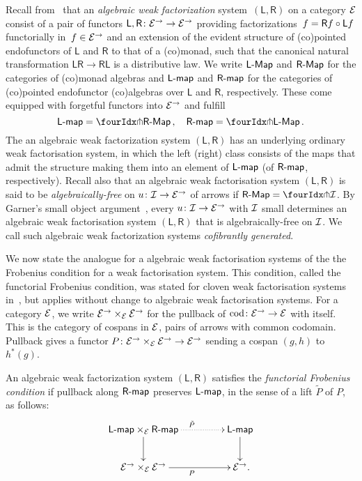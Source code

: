 \documentclass[reqno,10pt,a4paper,oneside,draft]{amsart}
\newcommand{\LL}{\mathsf{L}}
\newcommand{\RR}{\mathsf{R}}
\begin{document}
{{Recall from~\cite{garner:small-object-argument,grandis-tholen-nwfs} that an \emph{algebraic weak factorization} system~$(\LL, \RR)$ on a category $\cal{E}$ consist of a pair of functors $\LL, \RR \co \cal{E}^\to \to \cal{E}^\to$ providing factorizations~$f = \RR f \cc \LL f$ functorially in~$f \in \cal{E}^\to$ and an extension of the 
evident structure of (co)pointed endofunctors of $\LL$ and $\RR$ to that of a (co)monad, such that the canonical natural transformation $\LL \RR \to \RR \LL$ is a distributive law. 
We write $\pCoalg{\LL}$ and $\pAlg{\RR}$ for the categories of (co)monad algebras and $\pcoalg{\LL}$ and $\palg{\RR}$ for the categories of (co)pointed endofunctor (co)algebras over $\LL$ and $\RR$, respectively.
These come equipped with forgetful functors into $\cal{E}^\to$ and fulfill 
\[
\pcoalg{\LL} = \liftl{\pAlg{\RR}} \, , \quad \palg{\RR} = \liftr{\pCoalg{\LL}} \, .
\]
The an algebraic weak factorization system $(\LL, \RR)$ has an underlying ordinary weak factorisation system, in which the left (right) class 
consists of the maps that admit the structure making them into an element of $\pcoalg{\LL}$ (of $\palg{\RR}$, respectively). Recall also that an algebraic weak factorisation system 
$(\LL, \RR)$ is said to be \emph{algebraically-free} on $u \co \cal{I} \to \cal{E}^\to$ of arrows if $\pAlg{\RR} = \liftr{\cal{I}}$. By Garner's small object argument~\cite{garner:small-object-argument}, every $u \co \cal{I} \to \cal{E}^\to$ with $\cal{I}$ small determines an algebraic weak factorisation system $(\LL, \RR)$ that is algebraically-free on $\cal{I}$. We call such algebraic
weak factorization systems \emph{cofibrantly generated}.


We now state the analogue for a algebraic weak factorisation systems of the the Frobenius condition for a weak factorisation system.
This condition, called the functorial Frobenius condition, was stated for cloven weak factorisation systems in~\cite{garner:topological-simplicial},
but applies without change to algebraic weak factorisation systems. For a category $\cal{E}$, we write $\cal{E}^\to \times_\cal{E} \cal{E}^\to$
for the pullback of $\cod \co \cal{E}^\to \to \cal{E}$ with itself. This is the category of cospans in
$\cal{E}$, \ie pairs of arrows with common codomain. Pullback gives a functor
$P \co  \cal{E}^\to \times_{\cal{E}} \cal{E}^\to \to \cal{E}^\to$
sending a cospan $(g, h)$ to $h^*(g)$.

\begin{definition} \label{functorial-frobenius}
An algebraic weak factorization system $(\LL, \RR)$ satisfies the \emph{functorial Frobenius condition} if pullback along $\palg{\RR}$
preserves $\pcoalg{\LL}$, in the sense of a lift $\tilde{P}$ of $P$, as follows:
\[
\xymatrix@C+2em{
  \pcoalg{\LL} \times_{\cal{E}} \palg{\RR}
  \ar@{.>}[r]^{\tilde{P}}
  \ar[d]
&
  \pcoalg{\LL}
  \ar[d]
\\
  \cal{E}^\to \times_{\cal{E}} \cal{E}^\to
  \ar[r]_{P}
&
  \cal{E}^\to
\rlap{.}}
\]
\end{definition}

}}
\end{document}
